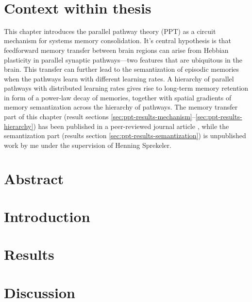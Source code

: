 


\graphicspath{{chapter_PPT/figures/}}
\

\section{Context within thesis}

This chapter introduces the parallel pathway theory (PPT) as a circuit mechanism for systems memory consolidation. It's central hypothesis is that feedforward memory transfer between brain regions can arise from Hebbian plasticity in parallel synaptic pathways---two features that are ubiquitous in the brain. This transfer can further lead to the semantization of episodic memories when the pathways learn with different learning rates. A hierarchy of parallel pathways with distributed learning rates gives rise to long-term memory retention in form of a power-law decay of memories, together with spatial gradients of memory semantization across the hierarchy of pathways.
The memory transfer part of this chapter (result sections \ref{sec:ppt-results-mechanism}--\ref{sec:ppt-results-hierarchy}) has been published in a peer-reviewed journal article \cite{Remme2021}, while the semantization part (results section \ref{sec:ppt-results-semantization}) is unpublished work by me under the supervision of Henning Sprekeler.

\section{Abstract}


\section{Introduction}


\section{Results}


\section{Discussion}


